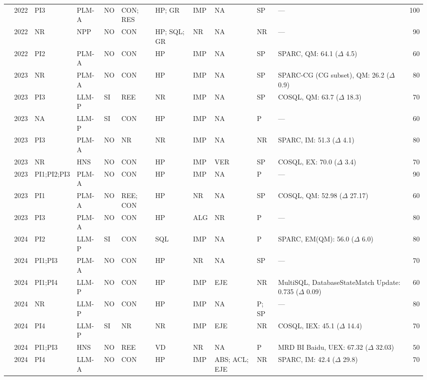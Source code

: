 {\begin{longtable}{@{}l l l l l l l l l l p{4.4cm} r@{}}
\cite{Qi2022RASAT} & 2022 & PI3 & PLM-A & NO & CON; RES & HP; GR & IMP & NA & SP & --- & 100 \\
\cite{Huang2022SeSQL} & 2022 & NR & NPP & NO & CON & HP; SQL; GR & NR & NA & NR & --- & 90 \\
\cite{Li2022Pay} & 2022 & PI2 & PLM-A & NO & CON & HP & IMP & NA & SP & SPARC, QM: 64.1 ($\Delta$ 4.5) & 60 \\
\cite{Liu2023Exploring} & 2023 & NR & PLM-A & NO & CON & HP & IMP & NA & SP & SPARC-CG (CG subset), QM: 26.2 ($\Delta$ 0.9) & 80 \\
\cite{Zhang2023ACTSQL} & 2023 & PI3 & LLM-P & SI & REE & NR & IMP & NA & SP & COSQL, QM: 63.7 ($\Delta$ 18.3) & 70 \\
\cite{Liu2023Comprehensive} & 2023 & NA & LLM-P & SI & CON & HP & IMP & NA & P & --- & 60 \\
\cite{Bazaga2023SQLformer} & 2023 & PI3 & PLM-A & NO & NR & NR & IMP & NA & NR & SPARC, IM: 51.3 ($\Delta$ 4.1) & 80 \\
\cite{HariKrishnanParthasarathi2023Conversational} & 2023 & NR & HNS & NO & CON & HP & IMP & VER & SP & COSQL, EX: 70.0 ($\Delta$ 3.4) & 70 \\
\cite{Fu2023MIGA} & 2023 & PI1;PI2;PI3 & PLM-A & NO & CON & HP & IMP & NA & P & --- & 90 \\
\cite{Li2023DIR} & 2023 & PI1 & PLM-A & NO & REE; CON & HP & NR & NA & SP & COSQL, QM: 52.98 ($\Delta$ 27.17) & 60 \\
\cite{Dou2023UniSAr} & 2023 & PI3 & PLM-A & NO & CON & HP & ALG & NR & P & --- & 80 \\
\cite{Zhang2024CoESQL} & 2024 & PI2 & LLM-P & SI & CON & SQL & IMP & NA & P & SPARC, EM(QM): 56.0 ($\Delta$ 6.0) & 80 \\
\cite{Liu2024TPLink} & 2024 & PI1;PI3 & PLM-A & NO & CON & HP & NR & NA & SP & --- & 70 \\
\cite{Li2024MultiSQL} & 2024 & PI1;PI4 & LLM-P & NO & CON & HP & IMP & EJE & NR & MultiSQL, DatabaseStateMatch Update: 0.735 ($\Delta$ 0.09) & 60 \\
\cite{Ryu2024EHRSeqSQL} & 2024 & NR & LLM-P & NO & CON & HP & IMP & NA & P; SP & --- & 80 \\
\cite{Zhai2024Learn} & 2024 & PI4 & LLM-P & SI & NR & NR & IMP & EJE & NR & COSQL, IEX: 45.1 ($\Delta$ 14.4) & 70 \\
\cite{Lian2024ChatBI} & 2024 & PI1;PI3 & HNS & NO & REE & VD & NR & NA & P & MRD BI Baidu, UEX: 67.32 ($\Delta$ 32.03) & 50 \\
\cite{Sun2024QDASQL} & 2024 & PI4 & LLM-A & NO & CON & HP & IMP & ABS; ACL; EJE & NR & SPARC, IM: 42.4 ($\Delta$ 29.8) & 70 \\

\end{longtable}}
